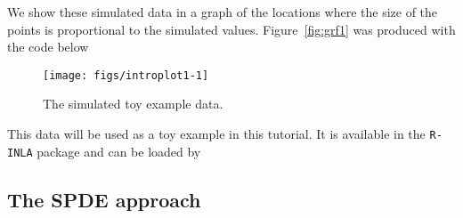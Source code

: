 We show these simulated data in a graph of 
the locations where the size of the points 
is proportional to the simulated values. 
Figure~\ref{fig:grf1} was produced with the code below 
\begin{knitrout}
\color{fgcolor}\begin{kframe}
\begin{alltt}
\hlstd{(}\hlstd{=}\hlstd{(}\hlstd{,}\hlstd{,}\hlstd{,}\hlstd{),} \hlstd{=}\hlstd{(}\hlstd{,} \hlstd{,} \hlstd{),} \hlstd{=}\hlstd{)}
 \hlstd{=}\hlstd{,} \hlstd{=}\hlstd{(}\hlstd{,}\hlstd{),} \hlopt{/}\hlstd{)}
 \hlkwb{<-}  \hlopt{:}\hlopt{/}\hlstd{)}
\hlstd{(}\hlstd{,}  \hlstd{=}\hlstd{),} \hlstd{=}\hlstd{,} \hlopt{/}\hlstd{)}
\end{alltt}
\end{kframe}
\end{knitrout}
\begin{figure}\centering
\begin{knitrout}
\color{fgcolor}
\texttt{[image: figs/introplot1-1]} 

\end{knitrout}
\caption{The simulated toy example data.}
\end{figure}\label{fig:grf1}

This data will be used as a toy example in this tutorial. 
It is available in the \texttt{R-INLA} package and 
can be loaded by 
\begin{knitrout}
\color{fgcolor}\begin{kframe}
\begin{alltt}
\end{alltt}
\end{kframe}
\end{knitrout}

\subsection{The SPDE approach}\label{sec:spde} 

